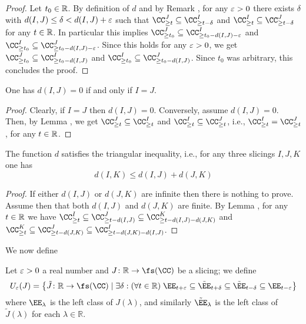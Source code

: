 \begin{proof}
Let $t_0\in \mathbb{R}$. By definition of $d$ and by Remark , for any $\varepsilon>0$ there exists $\delta$ with $d(I,J)\leq \delta<d(I,J)+\varepsilon$ such that $\CC_{\geq t}^J\subseteq \CC_{\geq t-\delta}^I$ and $\CC_{\geq t}^I\subseteq \CC_{\geq t-\delta}^J$ for any $t\in \mathbb{R}$. In particular this implies $\CC_{\geq t_0}^J\subseteq \CC_{\geq t_0-d(I,J)-\eps}^I$ and $\CC_{\geq t_0}^I\subseteq  \CC_{\geq t_0-d(I,J)-\eps}^J$. Since this holds for any $\varepsilon>0$, we get $\CC_{\geq t_0}^J\subseteq \CC_{\geq t_0-d(I,J)}^I$ and $\CC_{\geq t_0}^I\subseteq  \CC_{\geq t_0-d(I,J)}^J$. Since $t_0$ was arbitrary, this concludes the proof.
\end{proof}
\begin{lemma}\label{lem.zero.distance}
One has $d(I,J)=0$ if and only if $I=J$.
\end{lemma}
\begin{proof}
Clearly, if $I=J$ then $d(I,J)=0$. Conversely, assume $d(I,J)=0$. Then, by Lemma , we get $\CC_{\geq t}^J\subseteq \CC_{\geq t}^I$ and $\CC_{\geq t}^I\subseteq  \CC_{\geq t}^J$, i.e., $\CC_{\geq t}^I=\CC_{\geq t}^J$, for any $t\in\mathbb{R}$.
\end{proof}
\begin{lemma}\label{lem.triangle.ineq}
The function $d$ satisfies the triangular inequality, i.e., for any three slicings $I,J,K$ one has
\[
d(I,K)\leq d(I,J)+d(J,K)
\]
\end{lemma}
\begin{proof}
If either $d(I,J)$ or $d(J,K)$ are infinite then there is nothing to prove. Assume then that both $d(I,J)$ and $d(J,K)$ are finite. By Lemma  , for any $t\in \mathbb{R}$ we have $\CC_{\geq t}^{I}\subseteq 
\CC_{\geq t-d(I,J)}^{J}\subseteq \CC_{\geq t-d(I,J)-d(J,K)}^{K}$ and $\CC_{\geq t}^{K}\subseteq \CC_{\geq t-d(J,K)}^{J}\subseteq \CC_{\geq t-d(J,K)-d(I,J)}^{I}$.
\end{proof}
We now define\fare
\begin{definition}\label{this.basis}
Let $\varepsilon > 0$ a real number and $J\colon \R\to \fs(\CC)$ be a slicing; we define
\[
U_\eps(J) = \big\{ \tilde{J}\colon \R\to \fs(\CC)\mid \exists \delta : (\forall t\in\R)\;\EE_{t+\eps} \subseteq \tilde{\EE}_{t+\delta} \subseteq \tilde{\EE}_{t-\delta} \subseteq \EE_{t-\eps} \big\}
\]
where $\EE_\lambda$ is the left class of $J(\lambda)$, and similarly $\tilde{\EE}_\lambda$ is the left class of $\tilde{J}(\lambda)$ for each $\lambda\in\mathbb R$.
\end{definition}
